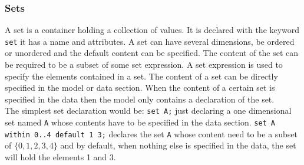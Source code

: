 \subsubsection{Sets}
A set is a container holding a collection of values. It is declared with the keyword \verb=set= it has a name and attributes. A set can have several dimensions, be ordered or unordered and the default content can be specified. The content of the set can be required to be a subset of some set expression. A set expression is used to specify the elements contained in a set. The content of a set can be directly specified in the model or data section. When the content of a certain set is specified in the data then the model only contains a declaration of the set.\\
The simplest set declaration would be: \verb=set A;= just declaring a one dimensional set named \verb=A= whose contents have to be specified in the data section. 
\verb&set A within 0..4 default 1 3;& declares the set \verb=A= whose content need to be a subset of $\lbrace 0,1,2,3,4\rbrace$ and by default, when nothing else is specified in the data, the set will hold the elements 1 and 3.
